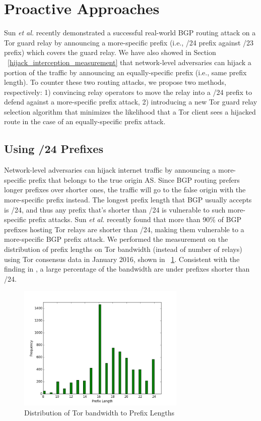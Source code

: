 \section{Proactive Approaches}
\label{sec:proactive}
Sun \emph{et al.} \cite{sun2015raptor} recently demonstrated a successful real-world BGP routing attack on a Tor guard relay by announcing a more-specific prefix (i.e., /24 prefix against /23 prefix) which covers the guard relay. We have also showed in Section ~\ref{hijack_interception_measurement} that network-level adversaries can hijack a portion of the traffic by announcing an equally-specific prefix (i.e., same prefix length). To counter these two routing attacks, we propose two methods, respectively: 1) convincing relay operators to move the relay into a /24 prefix to defend against a more-specific prefix attack, 2) introducing a new Tor guard relay selection algorithm that minimizes the likelihood that a Tor client sees a hijacked route in the case of an equally-specific prefix attack.

\subsection{Using /24 Prefixes}
\label{subsec:24prefix}

Network-level adversaries can hijack internet traffic by announcing a more-specific prefix that belongs to the true origin AS. Since BGP routing prefers longer prefixes over shorter ones, the traffic will go to the false origin with the more-specific prefix instead. The longest prefix length that BGP usually accepts is /24, and thus any prefix that's shorter than /24 is vulnerable to such more-specific prefix attacks. 
Sun \emph{et al.} \cite{sun2015raptor} recently found that more than 90\% of BGP prefixes hosting Tor relays are
shorter than /24, making them vulnerable to a more-specific BGP prefix attack. We performed the measurement on the distribution of prefix lengths on Tor bandwidth (instead of number of relays) using Tor consensus data in January 2016, shown in ~\ref{fig_prefixlen}. Consistent with the finding in \cite{sun2015raptor}, a large percentage of the bandwidth are under prefixes shorter than /24. 

\begin{figure}[ht!]
\centering
\includegraphics[width=80mm]{prefix_len_graph}
\caption{Distribution of Tor bandwidth to Prefix Lengths  \label{fig_prefixlen}}
\end{figure}

